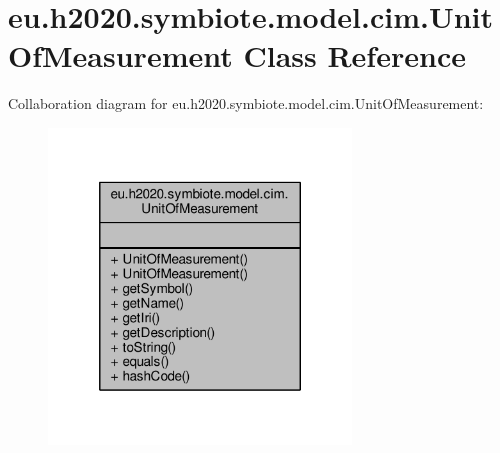 \hypertarget{classeu_1_1h2020_1_1symbiote_1_1model_1_1cim_1_1UnitOfMeasurement}{}\section{eu.\+h2020.\+symbiote.\+model.\+cim.\+Unit\+Of\+Measurement Class Reference}
\label{classeu_1_1h2020_1_1symbiote_1_1model_1_1cim_1_1UnitOfMeasurement}


Collaboration diagram for eu.\+h2020.\+symbiote.\+model.\+cim.\+Unit\+Of\+Measurement\+:\nopagebreak
\begin{figure}[H]
\begin{center}
\leavevmode
\includegraphics[width=228pt]{classeu_1_1h2020_1_1symbiote_1_1model_1_1cim_1_1UnitOfMeasurement__coll__graph}
\end{center}
\end{figure}
